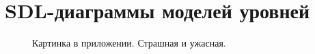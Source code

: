 \chapter{SDL-диаграммы моделей уровней}
\label{cha:appendix1}

{
\begin{figure}
\centering
\caption{Картинка в приложении. Страшная и ужасная.}
\end{figure}
}

